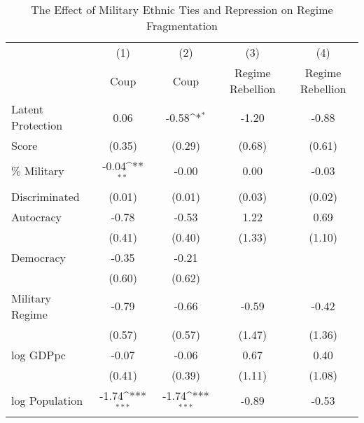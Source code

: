 \begin{table}[htbp]\centering
\def\sym#1{\ifmmode^{#1}\else\(^{#1}\)\fi}
\caption{\label{tab2} The Effect of Military Ethnic Ties and Repression on Regime Fragmentation}
\begin{tabular}{l*{4}{c}}
\hline\hline
                    &\multicolumn{1}{c}{(1)}         &\multicolumn{1}{c}{(2)}         &\multicolumn{1}{c}{(3)}         &\multicolumn{1}{c}{(4)}         \\
                    &        Coup         &        Coup         &Regime Rebellion         &Regime Rebellion         \\
\hline
Latent Protection   &        0.06         &       -0.58\sym{*}  &       -1.20         &       -0.88         \\
Score               &      (0.35)         &      (0.29)         &      (0.68)         &      (0.61)         \\
\% Military         &       -0.04\sym{**} &       -0.00         &        0.00         &       -0.03         \\
Discriminated       &      (0.01)         &      (0.01)         &      (0.03)         &      (0.02)         \\
Autocracy           &       -0.78         &       -0.53         &        1.22         &        0.69         \\
                    &      (0.41)         &      (0.40)         &      (1.33)         &      (1.10)         \\
Democracy           &       -0.35         &       -0.21         &                     &                     \\
                    &      (0.60)         &      (0.62)         &                     &                     \\
Military Regime     &       -0.79         &       -0.66         &       -0.59         &       -0.42         \\
                    &      (0.57)         &      (0.57)         &      (1.47)         &      (1.36)         \\
log GDPpc           &       -0.07         &       -0.06         &        0.67         &        0.40         \\
                    &      (0.41)         &      (0.39)         &      (1.11)         &      (1.08)         \\
log Population      &       -1.74\sym{***}&       -1.74\sym{***}&       -0.89         &       -0.53         \\

\end{tabular}
\end{table}
